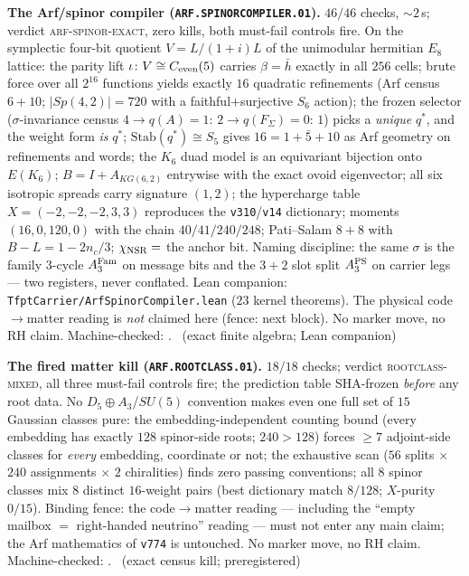 \documentclass[11pt,a4paper]{article}
\theoremstyle{definition}
\begin{document}
\par\smallskip\noindent\textbf{The Arf/spinor compiler
(\texttt{ARF.SPINORCOMPILER.01}).}
$46/46$ checks, ${\sim}2$\,s; verdict \textsc{arf-spinor-exact},
zero kills, both must-fail controls fire.  On the symplectic
four-bit quotient $V=L/(1{+}i)L$ of the unimodular hermitian $E_8$
lattice: the parity lift $\iota\colon V\cong C_{\rm even}(5)$
carries $\beta=\bar h$ exactly in all $256$ cells; brute force
over all $2^{16}$ functions yields exactly $16$ quadratic
refinements (Arf census $6+10$; $|Sp(4,2)|=720$ with a
faithful$+$surjective $S_6$ action); the frozen selector
($\sigma$-invariance census $4\to q(A){=}1$: $2\to
q(F_\Sigma){=}0$: $1$) picks a \emph{unique} $q^{*}$, and the
weight form \emph{is} $q^{*}$; $\mathrm{Stab}(q^{*})\cong S_5$
gives $16=1+\bar 5+10$ as Arf geometry on refinements and words;
the $K_6$ duad model is an equivariant bijection onto $E(K_6)$;
$B=I+A_{KG(6,2)}$ entrywise with the exact ovoid eigenvector; all
six isotropic spreads carry signature $(1,2)$; the hypercharge
table $X=(-2,-2,-2,3,3)$ reproduces the \texttt{v310}/\texttt{v14}
dictionary; moments $(16,0,120,0)$ with the chain $40/41/240/248$;
Pati--Salam $8+8$ with $B{-}L=1-2n_c/3$; $\chi_{\rm NSR}=$ the
anchor bit.  Naming discipline: the same $\sigma$ is the family
3-cycle $A_3^{\rm Fam}$ on message bits and the $3{+}2$ slot split
$A_3^{\rm PS}$ on carrier legs --- two registers, never conflated.
Lean companion: \texttt{TfptCarrier/ArfSpinorCompiler.lean} ($23$
kernel theorems).  The physical code$\to$matter reading is
\emph{not} claimed here (fence: next block).  No marker move, no
RH claim.
Machine-checked: .
\mE\ (exact finite algebra; Lean companion)
\par\smallskip

\par\smallskip\noindent\textbf{The fired matter kill
(\texttt{ARF.ROOTCLASS.01}).}
$18/18$ checks; verdict \textsc{rootclass-mixed}, all three
must-fail controls fire; the prediction table SHA-frozen
\emph{before} any root data.  No $D_5{\oplus}A_3$/$SU(5)$
convention makes even one full set of $15$ Gaussian classes pure:
the embedding-independent counting bound (every embedding has
exactly $128$ spinor-side roots; $240>128$) forces $\ge7$
adjoint-side classes for \emph{every} embedding, coordinate or
not; the exhaustive scan ($56$ splits $\times$ $240$ assignments
$\times$ $2$ chiralities) finds zero passing conventions; all $8$
spinor classes mix $8$ distinct $16$-weight pairs (best dictionary
match $8/128$; $X$-purity $0/15$).  Binding fence: the
code$\to$matter reading --- including the ``empty mailbox $=$
right-handed neutrino'' reading --- must not enter any main claim;
the Arf mathematics of \texttt{v774} is untouched.  No marker
move, no RH claim.
Machine-checked: .
\mE\ (exact census kill; preregistered)
\par\smallskip
\end{document}
